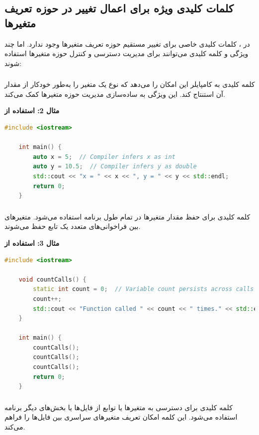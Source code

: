 \documentclass[12pt, a4paper]{report}
\begin{document}
\subsection{کلمات کلیدی ویژه برای اعمال تغییر در حوزه تعریف متغیرها}
در ، کلمات کلیدی خاصی برای تغییر مستقیم حوزه تعریف متغیرها وجود ندارد. اما چند ویژگی و کلمه کلیدی می‌توانند برای مدیریت دسترسی و کنترل حوزه متغیرها استفاده شوند:

\subsubsection{ }
کلمه کلیدی  به کامپایلر این امکان را می‌دهد که نوع یک متغیر را به‌طور خودکار از مقدار آن استنتاج کند. این ویژگی به ساده‌سازی مدیریت حوزه متغیرها کمک می‌کند.

\textbf{مثال 2: استفاده از }
\LTR
\begin{lstlisting}[language=C++, breaklines=true]
	#include <iostream>
	
	int main() {
		auto x = 5;  // Compiler infers x as int
		auto y = 10.5;  // Compiler infers y as double
		std::cout << "x = " << x << ", y = " << y << std::endl;
		return 0;
	}
\end{lstlisting}
\RTL

\subsubsection{ }
کلمه کلیدی  برای حفظ مقدار متغیرها در تمام طول برنامه استفاده می‌شود. متغیرهای  بین فراخوانی‌های متعدد یک تابع حفظ می‌شوند.

\textbf{مثال 3: استفاده از }
\LTR
\begin{lstlisting}[language=C++, breaklines=true]
	#include <iostream>
	
	void countCalls() {
		static int count = 0;  // Variable count persists across calls
		count++;
		std::cout << "Function called " << count << " times." << std::endl;
	}
	
	int main() {
		countCalls();
		countCalls();
		countCalls();
		return 0;
	}
\end{lstlisting}
\RTL
\subsubsection{}
کلمه کلیدی  برای دسترسی به متغیرها یا توابع از فایل‌ها یا بخش‌های دیگر برنامه استفاده می‌شود. این کلمه امکان تعریف متغیرهای سراسری بین فایل‌ها را فراهم می‌کند.
\end{document}
